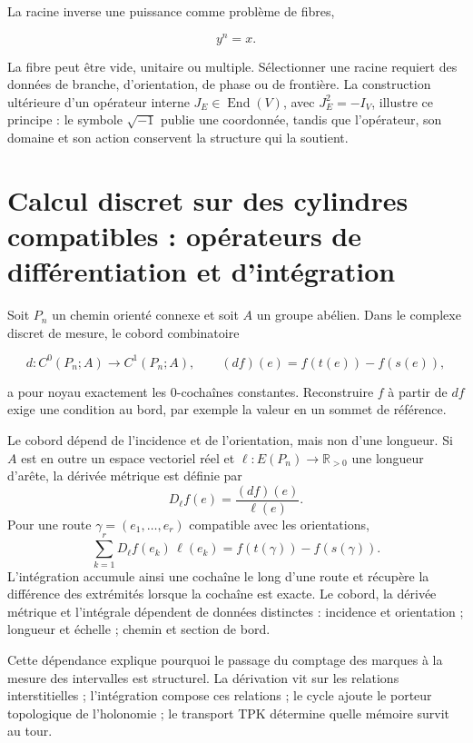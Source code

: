 La racine inverse une puissance comme problème de fibres,

\[
 y^n=x.
\]

La fibre peut être vide, unitaire ou multiple. Sélectionner une racine requiert des
données de branche, d'orientation, de phase ou de frontière. La construction ultérieure d'un
opérateur interne \(J_E\in\operatorname{End}(V)\), avec \(J_E^2=-I_V\),
illustre ce principe : le
symbole \(\sqrt{-1}\) publie une coordonnée, tandis que l'opérateur, son domaine
et son action conservent la structure qui la soutient.

\section{Calcul discret sur des cylindres compatibles : opérateurs de différentiation et d'intégration}

Soit \(P_n\) un chemin orienté connexe et soit \(A\) un groupe abélien. Dans le
complexe discret de mesure, le cobord combinatoire

\[
 d:C^0(P_n;A)\longrightarrow C^1(P_n;A),
 \qquad (df)(e)=f(t(e))-f(s(e)),
\]

a pour noyau exactement les \(0\)-cochaînes constantes. Reconstruire
\(f\) à partir de \(df\) exige une condition au bord, par exemple la valeur en un
sommet de référence.

Le cobord dépend de l'incidence et de l'orientation, mais non d'une
longueur. Si \(A\) est en outre un espace vectoriel réel et
\(\ell:E(P_n)\to\mathbb R_{>0}\) une longueur d'arête, la dérivée
métrique est définie par
\[
 D_\ell f(e)=\frac{(df)(e)}{\ell(e)}.
\]
Pour une route \(\gamma=(e_1,\ldots,e_r)\) compatible avec les orientations,
\begin{equation}
 \sum_{k=1}^r D_\ell f(e_k)\,\ell(e_k)
 =f(t(\gamma))-f(s(\gamma)).
 \label{eq:integracion-derivada-metrica-rev2}
\end{equation}
L'intégration accumule ainsi une cochaîne le long d'une route et récupère la
différence des extrémités lorsque la cochaîne est exacte. Le cobord, la dérivée métrique
et l'intégrale dépendent de données distinctes : incidence et orientation ; longueur et
échelle ; chemin et section de bord.

Cette dépendance explique pourquoi le passage du comptage des marques à la mesure des intervalles
est structurel. La dérivation vit sur les relations interstitielles ;
l'intégration compose ces relations ; le cycle ajoute le porteur topologique de
l'holonomie ; le transport TPK détermine quelle mémoire survit au tour.

